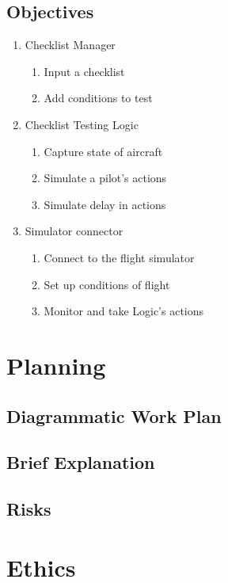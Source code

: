 \documentclass[a4paper]{article}
\begin{document}
\subsection*{Objectives}
\begin{enumerate}
    \item Checklist Manager
    \begin{enumerate}
        \item Input a checklist
        \item Add conditions to test        
    \end{enumerate}
    \item Checklist Testing Logic
    \begin{enumerate}
        \item Capture state of aircraft
        \item Simulate a pilot's actions
        \item Simulate delay in actions
    \end{enumerate}
    \item Simulator connector
    \begin{enumerate}
        \item Connect to the flight simulator
        \item Set up conditions of flight
        \item Monitor and take Logic's actions
    \end{enumerate}
\end{enumerate}

\section{Planning}
\subsection{Diagrammatic Work Plan}

\subsection{Brief Explanation}

\subsection{Risks}


\clearpage

\section{Ethics}
\end{document}
